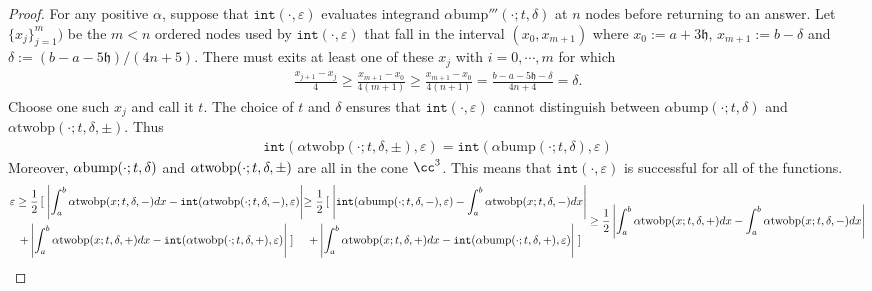 \documentclass{iitthesis}
\theoremstyle{definition}
\theoremstyle{remark}
\begin{document}
\begin{proof}
  For any positive $\alpha$, suppose that $\texttt{int}(\cdot,\varepsilon)$ evaluates integrand $\alpha\text{bump}'''(\cdot;t,\delta)$ at $n$ nodes before returning to an answer. Let $\{x_j\}_{j=1}^{m})$ be the $m<n$ ordered nodes used by $\texttt{int}(\cdot,\varepsilon)$ that fall in the interval $(x_{0},x_{m+1})$ where $x_{0}:=a+3\mathfrak{h}$, $x_{m+1}:=b-\delta$ and $\delta:=(b-a-5\mathfrak{h})/(4n+5)$. There must exits at least one of these $x_{j}$ with $i=0,\cdots,m$ for which
  \begin{align*}
    \frac{x_{j+1}-x_{j}}{4}\ge\frac{x_{m+1}-x_{0}}{4(m+1)}\ge\frac{x_{m+1}-x_{0}}{4(n+1)}=\frac{b-a-5\mathfrak{h}-\delta}{4n+4}=\delta.
  \end{align*}
  Choose one such $x_{j}$ and call it $t$. The choice of $t$ and $\delta$ ensures that $\texttt{int}(\cdot,\varepsilon)$ cannot distinguish between $\alpha\text{bump}(\cdot;t,\delta)$ and $\alpha\text{twobp}(\cdot;t,\delta,\pm)$. Thus
  \begin{align*}
    \texttt{int}(\alpha\text{twobp}(\cdot;t,\delta,\pm),\varepsilon)=\texttt{int}(\alpha\text{bump}(\cdot;t,\delta),\varepsilon)
  \end{align*}
  Moreover, $\alpha\textup{bump}(\cdot;t,\delta)$ and $\alpha\textup{twobp}(\cdot;t,\delta,\pm)$ are all in the cone $\cc^3$. This means that $\texttt{int}(\cdot,\varepsilon)$ is successful for all of the functions.
  \begin{subequations}
  \begin{multline*}
    \varepsilon\ge\frac{1}{2}\left[\right.\left|\int_{a}^{b}\alpha\textup{twobp}(x;t,\delta,-)dx-\texttt{int}(\alpha\textup{twobp}(\cdot;t,\delta,-),\varepsilon)\right|\\
    +\left|\int_{a}^{b}\alpha\textup{twobp}(x;t,\delta,+)dx-\texttt{int}(\alpha\textup{twobp}(\cdot;t,\delta,+),\varepsilon)\right|\left.\right]
  \end{multline*}
  \begin{multline*}
    \ge\frac{1}{2}\left[\right.\left|\texttt{int}(\alpha\textup{bump}(\cdot;t,\delta,-),\varepsilon)-\int_{a}^{b}\alpha\textup{twobp}(x;t,\delta,-)dx\right|\\
    +\left|\int_{a}^{b}\alpha\textup{twobp}(x;t,\delta,+)dx-\texttt{int}(\alpha\textup{bump}(\cdot;t,\delta,+),\varepsilon)\right|\left.\right]
  \end{multline*}
  \begin{align*}
     &\ge\frac{1}{2}\left|\int_{a}^{b}\alpha\textup{twobp}(x;t,\delta,+)dx-\int_{a}^{b}\alpha\textup{twobp}(x;t,\delta,-)dx\right|\\

\end{align*}
\end{subequations}
\end{proof}
\end{document}
